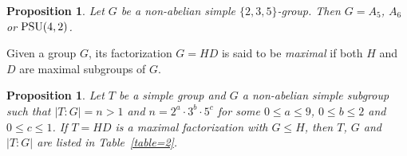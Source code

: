 \documentclass[12pt]{article}
\newtheorem{prop}[lem]{Proposition}%
\begin{document}
\begin{prop}\label{prop=235simplegroup}{\rm \cite[Theorem \MakeUppercase{} ]{Huppert2}}
Let $G$ be a non-abelian simple $\{2,3,5\}$-group.
Then $G= A_5$, $A_6$ or $\rm PSU(4,2)$.
\end{prop}

Given a group $G$, its factorization $G=HD$ is said to be \emph{maximal} if both $H$ and $D$ are maximal subgroups of $G$.

\begin{prop}\label{prop=simplegroupinedx2a3b5c}{\rm \cite[Lemma 3.3]{Fang5}}
Let $T$ be a simple group and $G$ a non-abelian simple subgroup such that $|T:G|=n>1$ and $n=2^a\cdot 3^b\cdot 5^c$ for some $0\leq a\leq 9$, $0\leq b\leq 2$ and $0\leq c \leq1$. If $T=HD$ is a maximal factorization with $G\leq H$, then $T$, $G$ and $|T:G|$ are listed in Table~\ref{table=2}.
\end{prop}
\end{document}
